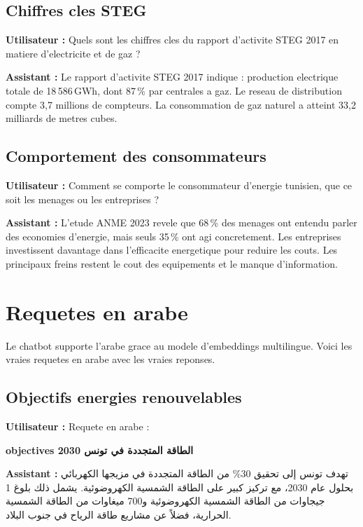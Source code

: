 \documentclass[12pt,a4paper,oneside]{article}
\newcommand{\prompt}[1]{%
  \noindent\colorbox{PromptBg}{\parbox{\dimexpr\linewidth-2\fboxsep}{%
    \small\textbf{\textcolor{MainBlue}{Utilisateur :}} #1%
  }}\vspace{3pt}%
}
\newcommand{\botreply}[1]{%
  \noindent\colorbox{OutputBg}{\parbox{\dimexpr\linewidth-2\fboxsep}{%
    \small\textbf{\textcolor{PassGreen!70!black}{Assistant :}} #1%
  }}\vspace{6pt}%
}
\begin{document}
\subsection{Chiffres cles STEG}

\prompt{Quels sont les chiffres cles du rapport d'activite STEG 2017 en matiere d'electricite et de gaz ?}

\botreply{
Le rapport d'activite STEG 2017 indique : production electrique totale de 18\,586\,GWh, dont 87\,\% par centrales a gaz. Le reseau de distribution compte 3,7 millions de compteurs. La consommation de gaz naturel a atteint 33,2 milliards de metres cubes.
}

\subsection{Comportement des consommateurs}

\prompt{Comment se comporte le consommateur d'energie tunisien, que ce soit les menages ou les entreprises ?}

\botreply{
L'etude ANME 2023 revele que 68\,\% des menages ont entendu parler des economies d'energie, mais seuls 35\,\% ont agi concretement. Les entreprises investissent davantage dans l'efficacite energetique pour reduire les couts. Les principaux freins restent le cout des equipements et le manque d'information.
}

\clearpage

\section{Requetes en arabe}

Le chatbot supporte l'arabe grace au modele d'embeddings multilingue. Voici les vraies requetes en arabe avec les vraies reponses.

\subsection{Objectifs energies renouvelables}

\prompt{Requete en arabe :}
{\arabicfont\large\bfseries objectives الطاقة المتجددة في تونس 2030}

\botreply{
{\arabicfont تهدف تونس إلى تحقيق 30\% من الطاقة المتجددة في مزيجها الكهربائي بحلول عام 2030، مع تركيز كبير على الطاقة الشمسية الكهروضوئية. يشمل ذلك بلوغ 1 جيجاوات من الطاقة الشمسية الكهروضوئية و700 ميغاوات من الطاقة الشمسية الحرارية، فضلاً عن مشاريع طاقة الرياح في جنوب البلاد.}
}
\end{document}
